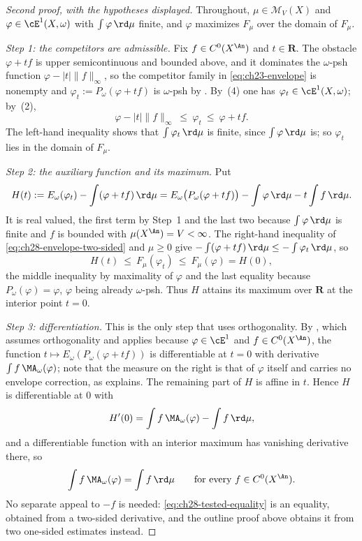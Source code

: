 \begin{proof}[Second proof, with the hypotheses displayed]
Throughout, \(\mu\in\mathcal M_V(X)\) and
\(\varphi\in\cE^1(X,\omega)\) with \(\int\varphi\,\rd\mu\) finite, and
\(\varphi\) maximizes \(F_\mu\) over the domain of \(F_\mu\).

\emph{Step 1: the competitors are admissible.}  Fix
\(f\in C^0(X^{\An})\) and \(t\in\mathbf R\).  The obstacle
\(\varphi+tf\) is upper semicontinuous and bounded above, and it dominates
the \(\omega\)-psh function \(\varphi-|t|\lVert f\rVert_\infty\), so the
competitor family in \eqref{eq:ch23-envelope} is nonempty and
\(\varphi_t:=P_\omega(\varphi+tf)\) is \(\omega\)-psh by
.  By
\,(4) one has
\(\varphi_t\in\cE^1(X,\omega)\); by
\,(2),
\begin{equation}
\label{eq:ch28-envelope-two-sided}
 \varphi-|t|\lVert f\rVert_\infty\ \leq\ \varphi_t\ \leq\ \varphi+tf .
\end{equation}
The left-hand inequality shows that \(\int\varphi_t\,\rd\mu\) is finite,
since \(\int\varphi\,\rd\mu\) is; so \(\varphi_t\) lies in the domain of
\(F_\mu\).

\emph{Step 2: the auxiliary function and its maximum.}  Put
\[
 H(t):=E_\omega(\varphi_t)-\int(\varphi+tf)\,\rd\mu
      =E_\omega\bigl(P_\omega(\varphi+tf)\bigr)
       -\int\varphi\,\rd\mu-t\int f\,\rd\mu .
\]
It is real valued, the first term by Step~1 and the last two because
\(\int\varphi\,\rd\mu\) is finite and \(f\) is bounded with
\(\mu(X^{\An})=V<\infty\).  The right-hand inequality of
\eqref{eq:ch28-envelope-two-sided} and \(\mu\geq0\) give
\(-\int(\varphi+tf)\,\rd\mu\leq-\int\varphi_t\,\rd\mu\), so
\[
 H(t)\ \leq\ F_\mu(\varphi_t)\ \leq\ F_\mu(\varphi)=H(0),
\]
the middle inequality by maximality of \(\varphi\) and the last equality
because \(P_\omega(\varphi)=\varphi\), \(\varphi\) being already
\(\omega\)-psh.  Thus \(H\) attains its maximum over \(\mathbf R\) at the
interior point \(t=0\).

\emph{Step 3: differentiation.}  This is the only step that uses
orthogonality.  By , which assumes
orthogonality and applies because \(\varphi\in\cE^1\) and
\(f\in C^0(X^{\An})\), the function
\(t\mapsto E_\omega(P_\omega(\varphi+tf))\) is differentiable at \(t=0\)
with derivative \(\int f\,\MA_\omega(\varphi)\); note that the measure on the
right is that of \(\varphi\) itself and carries no envelope correction, as
 explains.  The remaining part of \(H\)
is affine in \(t\).  Hence \(H\) is differentiable at \(0\) with
\[
 H'(0)=\int f\,\MA_\omega(\varphi)-\int f\,\rd\mu ,
\]
and a differentiable function with an interior maximum has vanishing
derivative there, so
\begin{equation}
\label{eq:ch28-tested-equality}
 \int f\,\MA_\omega(\varphi)=\int f\,\rd\mu
 \qquad\text{for every }f\in C^0(X^{\An}).
\end{equation}
No separate appeal to \(-f\) is needed: \eqref{eq:ch28-tested-equality} is
an equality, obtained from a two-sided derivative, and the outline proof
above obtains it from two one-sided estimates instead.


\end{proof}
